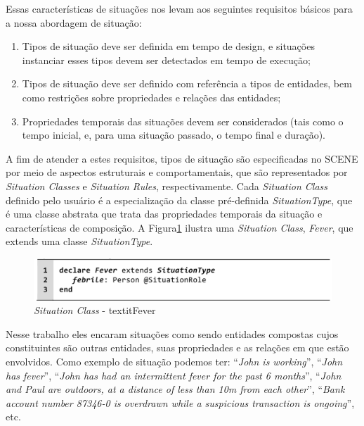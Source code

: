 \documentclass[12pt,a4paper,compsoc]{IEEEtran}
\begin{document}
  Essas características de situações nos levam aos seguintes requisitos básicos para a nossa
  abordagem de situação:
  \begin{enumerate}
    \item Tipos de situação deve ser definida em tempo de design, e situações instanciar esses
    tipos devem ser detectados em tempo de execução;
    \item Tipos de situação deve ser definido com referência a tipos de entidades, bem como 
    restrições sobre propriedades e relações das entidades;
    \item Propriedades temporais das situações devem ser considerados (tais como o tempo inicial,
    e, para uma situação passado, o tempo final e duração).  
  \end{enumerate}
  
  A fim de atender a estes requisitos, tipos de situação são especificadas no SCENE por meio de 
  aspectos estruturais e comportamentais, que são representados por  \textit{Situation Classes} e
  \textit{Situation Rules}, respectivamente. Cada \textit{Situation Class} definido pelo usuário é
  a especialização da classe pré-definida \textit{SituationType}, que é uma classe abstrata que
  trata das propriedades temporais da situação e características de composição.
  A Figura\ref{situation-classe-fever} ilustra uma \textit{Situation Class}, \textit{Fever}, que
  extends uma classe \textit{SituationType}.
  
  \begin{figure}[ht]
  \centerline{\includegraphics[scale=.25]{imagens/situation-classe-fever}}
  \caption{\textit{Situation Class} - textit{Fever} \cite{pereira2013rule}}
  \label{situation-classe-fever}
  \end{figure}

  Nesse trabalho eles encaram situações como sendo entidades compostas cujos constituintes são
  outras entidades, suas propriedades e as relações em que estão envolvidos. Como exemplo de
  situação podemos ter: ``\textit{John is working}'', ``\textit{John has fever}'', 
  ``\textit{John has had an intermittent fever for the past 6 months}'', 
  ``\textit{John and Paul are outdoors, at a distance of less than 10m from each other}'',
  ``\textit{Bank account number 87346-0 is overdrawn while a suspicious transaction is ongoing}'',
  etc.
\end{document}
